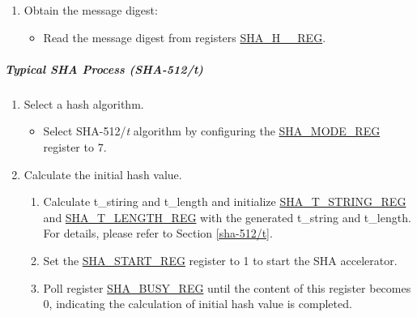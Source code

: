 \documentclass[main\_\_EN.tex]{subfiles}
\begin{document}
\begin{enumerate}
    \item \label{1typical6} Obtain the message digest:
    \begin{itemize}
        \item Read the message digest from registers \hyperref[regdesc:SHAHNREG]{SHA\_H\_\_REG}.
    \end{itemize}
\end{enumerate}


\subparagraph{Typical SHA Process (SHA-512/{\it{t}})}
\begin{enumerate}
    \item Select a hash algorithm.\label{2typical1}
        \begin{itemize}
            \item Select SHA-512/{\it{t}} algorithm by configuring the \hyperref[regdesc:SHAMODEREG]{SHA\_MODE\_REG} register to 7.
        \end{itemize}

    \item Calculate the initial hash value.
        \begin{enumerate}
            \item Calculate t\_stiring and t\_length and initialize \hyperref[regdesc:SHATSTRINGREG]{SHA\_T\_STRING\_REG} and  \hyperref[regdesc:SHATLENGTHREG]{SHA\_T\_LENGTH\_REG} with the generated t\_string and t\_length. For details, please refer to Section \ref{sha-512/t}.
            \item Set the \hyperref[regdesc:SHASTARTREG]{SHA\_START\_REG} register to 1 to start the SHA accelerator.
            \item Poll register \hyperref[regdesc:SHABUSYREG]{SHA\_BUSY\_REG} until the content of this register becomes 0, indicating the calculation of initial hash value is completed.
        \end{enumerate}


\end{enumerate}
\end{document}
